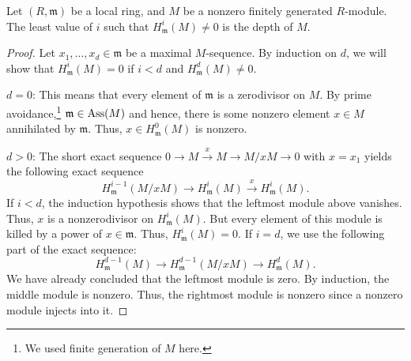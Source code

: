\documentclass[12pt]{article}
\begin{document}
\begin{thm}
	Let $(R, \mathfrak{m})$ be a local ring, and $M$ be a nonzero finitely generated $R$-module. The least value of $i$ such that $H_{\mathfrak{m}}^{i}(M) \neq 0$ is the depth of $M$.
\end{thm}
\begin{proof} 
	Let $x_{1}, \ldots, x_{d} \in \mathfrak{m}$ be a maximal $M$-sequence. By induction on $d$, we will show that $H_{\mathfrak{m}}^{i}(M) = 0$ if $i < d$ and $H_{\mathfrak{m}}^{d}(M) \neq 0$.

	$d = 0$: This means that every element of $\mathfrak{m}$ is a zerodivisor on $M$. By prime avoidance,\footnote{We used finite generation of $M$ here.} $\mathfrak{m} \in \operatorname{Ass}(M)$ and hence, there is some nonzero element $x \in M$ annihilated by $\mathfrak{m}$. Thus, $x \in H_{\mathfrak{m}}^{0}(M)$ is nonzero.

	$d > 0$: The short exact sequence $0 \to M \xrightarrow{x} M \to M/x M \to 0$ with $x = x_{1}$ yields the following exact sequence
	\begin{equation*} 
		H_{\mathfrak{m}}^{i - 1}(M/xM) \to H_{\mathfrak{m}}^{i}(M) \xrightarrow{x} H_{\mathfrak{m}}^{i}(M).
	\end{equation*}
	If $i < d$, the induction hypothesis shows that the leftmost module above vanishes. Thus, $x$ is a nonzerodivisor on $H_{\mathfrak{m}}^{i}(M)$. But every element of this module is killed by a power of $x \in \mathfrak{m}$. Thus, $H_{\mathfrak{m}}^{i}(M) = 0$. \newline
	If $i = d$, we use the following part of the exact sequence:
	\begin{equation*} 
		H_{\mathfrak{m}}^{d - 1}(M) \to H_{\mathfrak{m}}^{d - 1}(M/xM) \to H_{\mathfrak{m}}^{d}(M).
	\end{equation*}
	We have already concluded that the leftmost module is zero. By induction, the middle module is nonzero. Thus, the rightmost module is nonzero since a nonzero module injects into it.
\end{proof}
\end{document}
